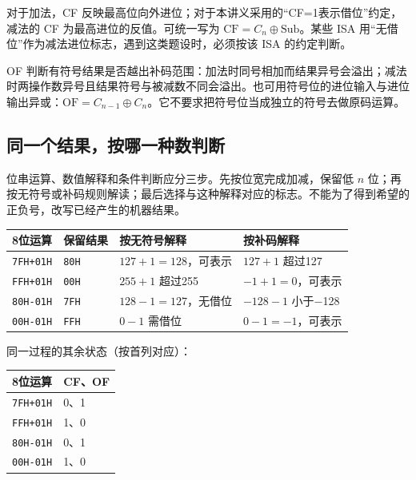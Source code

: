 对于加法，CF 反映最高位向外进位；对于本讲义采用的``CF=1表示借位''约定，减法的 CF 为最高进位的反值。可统一写为 \(\mathrm{CF}=C_n\oplus\mathrm{Sub}\)。某些 ISA 用``无借位''作为减法进位标志，遇到这类题设时，必须按该 ISA 的约定判断。

OF 判断有符号结果是否越出补码范围：加法时同号相加而结果异号会溢出；减法时两操作数异号且结果符号与被减数不同会溢出。也可用符号位的进位输入与进位输出异或：\(\mathrm{OF}=C_{n-1}\oplus C_n\)。它不要求把符号位当成独立的符号去做原码运算。

\subsection{同一个结果，按哪一种数判断}\label{CO02-12}

位串运算、数值解释和条件判断应分三步。先按位宽完成加减，保留低 \(n\) 位；再按无符号或补码规则解读；最后选择与这种解释对应的标志。不能为了得到希望的正负号，改写已经产生的机器结果。

\begin{wideblock}\par\medskip\noindent\begin{minipage}{\linewidth}\fontsize{9.3}{12}\selectfont\begin{tabularx}{\linewidth}{@{}YYYY@{}}
\toprule\noalign{}
8位运算 & 保留结果 & 按无符号解释 & 按补码解释 \\
\midrule\noalign{}


\texttt{7FH+\allowbreak{}01H} & \texttt{80H} & \(127+1=128\)，可表示 & \(127+1\) 超过127 \\
\texttt{FFH+\allowbreak{}01H} & \texttt{00H} & \(255+1\) 超过255 & \(-1+1=0\)，可表示 \\
\texttt{80H-01H} & \texttt{7FH} & \(128-1=127\)，无借位 & \(-128-1\) 小于\ensuremath{-}128 \\
\texttt{00H-01H} & \texttt{FFH} & \(0-1\) 需借位 & \(0-1=-1\)，可表示 \\
\bottomrule\end{tabularx}
\end{minipage}\par\medskip\end{wideblock}

同一过程的其余状态（按首列对应）：

\par\medskip\noindent\begin{minipage}{\linewidth}\fontsize{9.3}{12}\selectfont\begin{tabularx}{\linewidth}{@{}YY@{}}
\toprule\noalign{}
8位运算 & CF、OF \\
\midrule\noalign{}


\texttt{7FH+\allowbreak{}01H} & 0、1 \\
\texttt{FFH+\allowbreak{}01H} & 1、0 \\
\texttt{80H-01H} & 0、1 \\
\texttt{00H-01H} & 1、0 \\
\bottomrule\end{tabularx}
\end{minipage}\par\medskip

